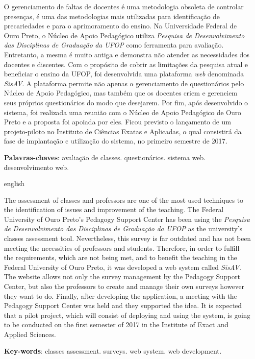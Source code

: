 \documentclass[
  12pt,       %
  openright,      %
  oneside,      %
  a4paper,      %
  english,      %
  french,        %
  spanish,     %
  brazil        %
  ]{abntex2-decsi}
\begin{document}
\begin{resumo}
O gerenciamento de faltas de docentes é uma metodologia obsoleta de controlar presenças, é uma das metodologias mais utilizadas para identificação de precariedades e para o aprimoramento do ensino. Na Universidade Federal de Ouro Preto, o Núcleo de Apoio Pedagógico utiliza \textit{Pesquisa de Desenvolvimento das Disciplinas de Graduação da UFOP} como ferramenta para avaliação. Entretanto, a mesma é muito antiga e demonstra não atender as necessidades dos docentes e discentes. Com o propósito de cobrir as limitações da pesquisa atual e beneficiar o ensino da UFOP, foi desenvolvida uma plataforma \textit{web} denominada \textit{SisAV}. A plataforma permite não apenas o gerenciamento de questionários pelo Núcleo de Apoio Pedagógico, mas também que os docentes criem e gerenciem seus próprios questionários do modo que desejarem. Por fim, após desenvolvido o sistema, foi realizada uma reunião com o Núcleo de Apoio Pedagógico de Ouro Preto e a proposta foi apoiada por eles. Ficou previsto o lançamento de um projeto-piloto no Instituto de Ciências Exatas e Aplicadas, o qual consistirá da fase de implantação e utilização do sistema, no primeiro semestre de 2017.

\textbf{Palavras-chaves}: avaliação de classes. questionários. sistema web. desenvolvimento web.
\end{resumo}

\begin{resumo}[Abstract]
 \begin{otherlanguage*}{english}
   
   The assessment of classes and professors are one of the most used techniques to the identification of issues and improvement of the teaching. The Federal University of Ouro Preto's Pedagogy Support Center has been using the \textit{Pesquisa de Desenvolvimento das Disciplinas de Graduação da UFOP} as the university's classes assessment tool. Nevertheless, this survey is far outdated and has not been meeting the necessities of professors and students. Therefore, in order to fulfill the requirements, which are not being met, and to benefit the teaching in the Federal University of Ouro Preto, it was developed a web system called \textit{SisAV}. The website allows not only the survey management by the Pedagogy Support Center, but also the professors to create and manage their own surveys however they want to do. Finally, after developing the application, a meeting with the Pedagogy Support Center was held and they supported the idea. It is expected that a pilot project, which will consist of deploying and using the system, is going to be conducted on the first semester of 2017 in the Institute of Exact and Applied Sciences.
   
   \vspace{\onelineskip}
   \noindent
   \textbf{Key-words}: classes assessment. surveys. web system. web development.
 \end{otherlanguage*}
\end{resumo}
\end{document}
